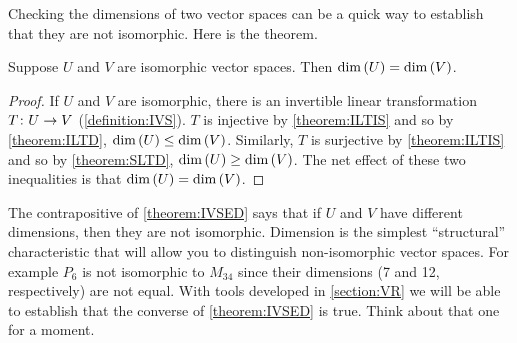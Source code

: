 \documentclass{ximera}
\begin{document}
Checking the dimensions of two vector spaces can be a quick way to establish that they are not isomorphic.  Here is the theorem.

\begin{theorem}
\label{theorem:IVSED}

Suppose $U$ and $V$ are isomorphic vector spaces.  Then $\dim\left(U\right)=\dim\left(V\right)$.

\begin{proof}
If $U$ and $V$ are isomorphic, there is an invertible linear transformation $T\colon U\rightarrow V$ (\ref{definition:IVS}).  $T$ is injective by \ref{theorem:ILTIS} and so by \ref{theorem:ILTD}, $\dim\left(U\right)\leq\dim\left(V\right)$.  Similarly, $T$ is surjective by \ref{theorem:ILTIS} and so by \ref{theorem:SLTD}, $\dim\left(U\right)\geq\dim\left(V\right)$.  The net effect of these two inequalities is that $\dim\left(U\right)=\dim\left(V\right)$.



\end{proof}
\end{theorem}

The contrapositive of \ref{theorem:IVSED} says that if $U$ and $V$ have different dimensions, then they are not isomorphic.  Dimension is the simplest ``structural'' characteristic that will allow you to distinguish non-isomorphic vector spaces.  For example $P_6$ is not isomorphic to $M_{34}$ since their dimensions (7 and 12, respectively) are not equal.  With tools developed in \ref{section:VR} we will be able to establish that the converse of \ref{theorem:IVSED} is true.  Think about that one for a moment.
\end{document}
